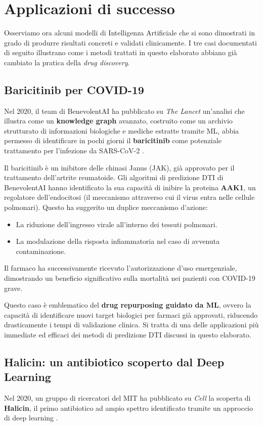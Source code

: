 \chapter{Applicazioni di successo}
Osserviamo ora alcuni modelli di Intelligenza 
Artificiale che si sono dimostrati in grado di produrre risultati concreti e validati 
clinicamente. 
I tre casi documentati di seguito illustrano come i 
metodi trattati in questo elaborato abbiano già cambiato 
la pratica della \textit{drug discovery}.

\section{Baricitinib per COVID-19}
Nel 2020, il team di BenevolentAI ha pubblicato 
su \textit{The Lancet} un'analisi che illustra come un \textbf{knowledge graph} avanzato, costruito come un archivio strutturato di 
informazioni biologiche e mediche estratte tramite ML,
abbia permesso di identificare in pochi giorni il 
\textbf{baricitinib} come potenziale trattamento per 
l'infezione da SARS-CoV-2 
\cite{richardsonBaricitinibPotentialTreatment2020}.

Il baricitinib è un inibitore delle chinasi Janus (JAK), 
già approvato per il trattamento dell'artrite reumatoide. 
Gli algoritmi di predizione DTI di BenevolentAI hanno 
identificato la sua capacità di inibire la proteina 
\textbf{AAK1}, un regolatore dell'endocitosi (il meccanismo attraverso cui il virus entra nelle cellule 
polmonari). Questo ha suggerito un duplice meccanismo 
d'azione: 
\begin{itemize}
    \item La riduzione dell'ingresso virale all'interno dei tessuti polmonari.
    \item La modulazione della risposta infiammatoria nel caso di avvenuta contaminazione.
\end{itemize}
Il farmaco ha successivamente ricevuto l'autorizzazione d'uso 
emergenziale, dimostrando un beneficio significativo 
sulla mortalità nei pazienti con COVID-19 grave.

Questo caso è emblematico del \textbf{drug repurposing 
guidato da ML}, ovvero la capacità di identificare nuovi 
target biologici per farmaci già approvati, 
riducendo drasticamente i tempi di validazione 
clinica.
Si tratta di una delle applicazioni più immediate 
ed efficaci dei metodi di predizione DTI 
discussi in questo elaborato.

\section{Halicin: un antibiotico scoperto dal Deep 
Learning}
Nel 2020, un gruppo di ricercatori del MIT ha pubblicato 
su \textit{Cell} la scoperta di \textbf{Halicin}, il 
primo antibiotico ad ampio spettro identificato tramite 
un approccio di deep learning 
\cite{stokesDeepLearningApproach2020}.

